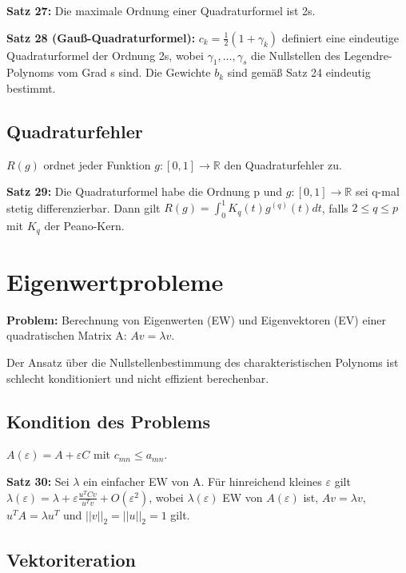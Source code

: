 \documentclass[a4paper]{article}
\begin{document}
\textbf{Satz 27:} Die maximale Ordnung einer Quadraturformel ist 2s.

\textbf{Satz 28 (Gauß-Quadraturformel):} $c_k = \frac{1}{2} (1 + \gamma_k)$
definiert eine eindeutige Quadraturformel der Ordnung 2s, wobei $\gamma_1,
\dots, \gamma_s$ die Nullstellen des Legendre-Polynoms vom Grad s sind. Die
Gewichte $b_k$ sind gemäß Satz 24 eindeutig bestimmt.

\subsection{Quadraturfehler}

$R(g)$ ordnet jeder Funktion $g: [0, 1] \to \mathbb{R}$ den Quadraturfehler zu.

\vspace{1em}

\textbf{Satz 29:} Die Quadraturformel habe die Ordnung p und $g : [0, 1] \to
\mathbb{R}$ sei q-mal stetig differenzierbar. Dann gilt $R(g) = \int_0^1 K_q(t)
g^{(q)} (t) dt$, falls $2 \le q \le p$ mit $K_q$ der Peano-Kern.

\section{Eigenwertprobleme}

\textbf{Problem:} Berechnung von Eigenwerten (EW) und Eigenvektoren (EV) einer
quadratischen Matrix A: $Av = \lambda v$.

Der Ansatz über die Nullstellenbestimmung des charakteristischen Polynoms ist
schlecht konditioniert und nicht effizient berechenbar.

\subsection{Kondition des Problems}

$A(\varepsilon) = A + \varepsilon C$ mit $c_{mn} \le a_{mn}$.

\textbf{Satz 30:} Sei $\lambda$ ein einfacher EW von A. Für hinreichend kleines
$\varepsilon$ gilt $\lambda(\varepsilon) = \lambda +  \varepsilon \frac{u^{T} C
v}{u^{T} v} + O(\varepsilon^2)$, wobei $\lambda(\varepsilon)$ EW von
$A(\varepsilon)$ ist, $Av = \lambda v$, $u^T A = \lambda u^T$ und $||v||_2 =
||u||_2 = 1$ gilt. 

\subsection{Vektoriteration}
\end{document}
